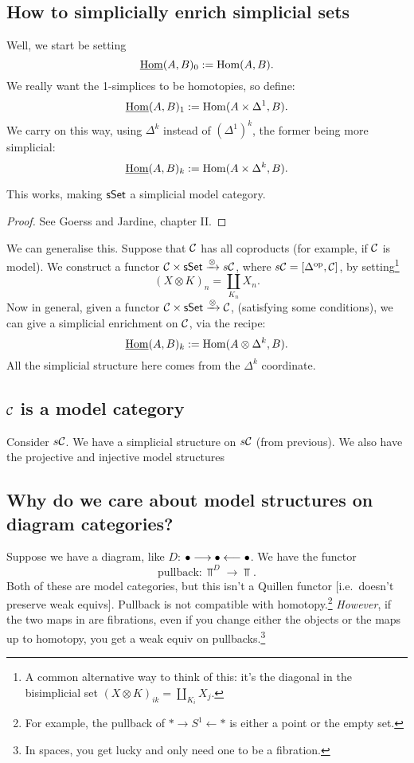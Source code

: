 \documentclass[11pt]{article}
\begin{document}
\begin{InnaSimplicalModelCats}
\subsection*{How to simplicially enrich simplicial sets}
Well, we start be setting 
\[\underline{\operatorname{Hom}}(A,B)_0:=\operatorname{Hom}(A,B).\]
We really want the 1-simplices to be homotopies, so define:
\[\underline{\operatorname{Hom}}(A,B)_1:=\operatorname{Hom}(A\times\Delta^1,B).\]
We carry on this way, using $\Delta^k$ instead of $(\Delta^1)^k$, the former being more simplicial:
\[\underline{\operatorname{Hom}}(A,B)_k:=\operatorname{Hom}(A\times\Delta^k,B).\]
\begin{thm*}[Quillen?]
This works, making $\operatorname{{\mathsf{sSet}}}$ a simplicial model category.
\end{thm*}
\begin{proof} See Goerss and Jardine, chapter II.
\end{proof}
We can generalise this. Suppose that $\mathcal{C}$ has all coproducts (for example, if $\mathcal{C}$ is model). We construct a functor $\mathcal{C}\times\operatorname{{\mathsf{sSet}}}\xrightarrow{\otimes}s\mathcal{C}$, where $s\mathcal{C}=[\Delta^{\textup{op}},\mathcal{C}]$, by setting\footnote{A common alternative way to think of this: it's the diagonal in the bisimplicial set $(X\otimes K)_{ik}=\coprod_{K_i}X_j$.}
\[(X\otimes K)_n=\coprod_{K_n}X_n.\]
Now in general, given a functor $\mathcal{C}\times\operatorname{{\mathsf{sSet}}}\xrightarrow{\otimes}\mathcal{C}$, (satisfying some conditions), we can give a simplicial enrichment on $\mathcal{C}$, via the recipe:
\[\underline{\operatorname{Hom}}(A,B)_k:=\operatorname{Hom}(A\otimes\Delta^k,B).\]
All the simplicial structure here comes from the $\Delta^k$ coordinate.

\subsection*{$\mathcal{C}$ is a model category}
Consider $s\mathcal{C}$. We have a simplicial structure on $s\mathcal{C}$ (from previous). We also have the projective and injective model structures
\subsection*{Why do we care about model structures on diagram categories?}
Suppose we have a diagram, like $D$: $\bullet\longrightarrow\bullet\longleftarrow\bullet$.  We have the functor
\[\text{pullback}:\Top^D\to\Top.\]
Both of these are model categories, but this isn't a Quillen functor [i.e.\ doesn't preserve weak equivs]. Pullback is not compatible with homotopy.\footnote{For example, the pullback of $\ast\longrightarrow S^1\longleftarrow\ast$ is either a point or the empty set.} \emph{However}, if the two maps in are fibrations, even if you change either the objects or the maps up to homotopy, you get a weak equiv on pullbacks.\footnote{In spaces, you get lucky and only need one to be a fibration.}


\end{InnaSimplicalModelCats}
\end{document}
